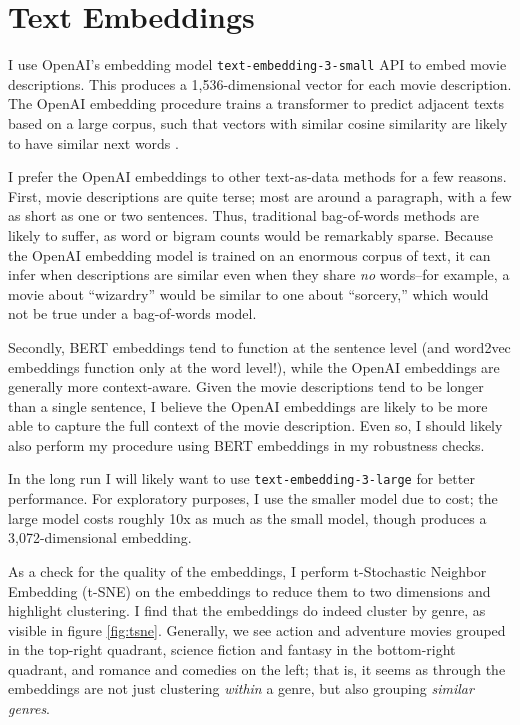 \documentclass{article}
\begin{document}
\section{Text Embeddings}

I use OpenAI's embedding model \texttt{text-embedding-3-small} API to embed movie descriptions. This produces a 1,536-dimensional vector for each movie description. The OpenAI embedding procedure trains a transformer to predict adjacent texts based on a large corpus, such that vectors with similar cosine similarity are likely to have similar next words \parencite{neelakantan2022ao, kusupati2022ao}.

I prefer the OpenAI embeddings to other text-as-data methods for a few reasons. First, movie descriptions are quite terse; most are around a paragraph, with a few as short as one or two sentences. Thus, traditional bag-of-words methods are likely to suffer, as word or bigram counts would be remarkably sparse. Because the OpenAI embedding model is trained on an enormous corpus of text, it can infer when descriptions are similar even when they share \emph{no} words--for example, a movie about ``wizardry'' would be similar to one about ``sorcery,'' which would not be true under a bag-of-words model.

Secondly, BERT embeddings tend to function at the sentence level (and word2vec embeddings function only at the word level!), while the OpenAI embeddings are generally more context-aware. Given the movie descriptions tend to be longer than a single sentence, I believe the OpenAI embeddings are likely to be more able to capture the full context of the movie description. Even so, I should likely also perform my procedure using BERT embeddings in my robustness checks.

In the long run I will likely want to use \texttt{text-embedding-3-large} for better performance. For exploratory purposes, I use the smaller model due to cost; the large model costs roughly 10x as much as the small model, though produces a 3,072-dimensional embedding.

As a check for the quality of the embeddings, I perform t-Stochastic Neighbor Embedding (t-SNE) on the embeddings to reduce them to two dimensions and highlight clustering. I find that the embeddings do indeed cluster by genre, as visible in figure \ref{fig:tsne}. Generally, we see action and adventure movies grouped in the top-right quadrant, science fiction and fantasy in the bottom-right quadrant, and romance and comedies on the left; that is, it seems as through the embeddings are not just clustering \emph{within} a genre, but also grouping \emph{similar genres}. 
\end{document}
